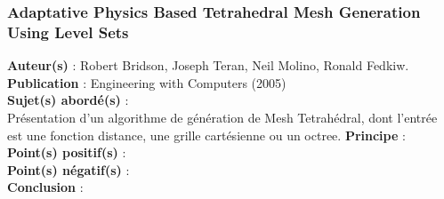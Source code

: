 \documentclass[a4paper,10pt]{article}
\begin{document}
\subsubsection{Adaptative Physics Based Tetrahedral Mesh Generation Using Level Sets}
\textbf{Auteur(s)} : Robert Bridson, Joseph Teran, Neil Molino, Ronald Fedkiw.\\
\textbf{Publication} : Engineering with Computers (2005)\\
\textbf{Sujet(s) abordé(s)} : \\
	Présentation d'un algorithme de génération de Mesh Tetrahédral, dont l'entrée est une fonction distance, une grille cartésienne ou un octree.
\textbf{Principe} :\\	
\textbf{Point(s) positif(s)} :\\
\textbf{Point(s) négatif(s)} :\\
\textbf{Conclusion} :\\






\end{document}
